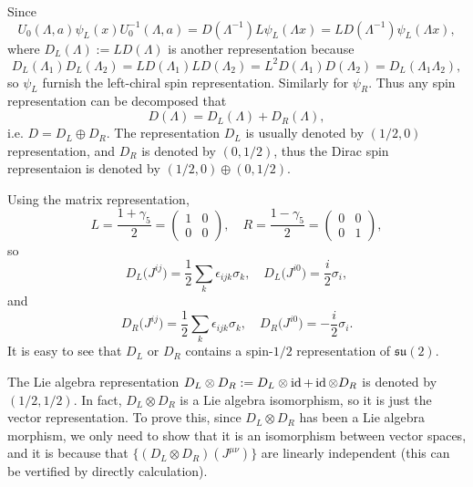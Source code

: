 \documentclass[9pt]{extbook}
\begin{document}
Since
\[
	U_0(\Lambda,a)\psi_L(x)U_0^{-1}(\Lambda,a)=D(\Lambda^{-1})L\psi_L(\Lambda x)=LD(\Lambda^{-1})\psi_L(\Lambda x),
\]
where $D_L(\Lambda):=LD(\Lambda)$ is another representation because
\[
	D_L(\Lambda_1)D_L(\Lambda_2)=LD(\Lambda_1)LD(\Lambda_2)=L^2D(\Lambda_1)D(\Lambda_2)=D_L(\Lambda_1\Lambda_2),
\]
so $\psi_L$ furnish the left-chiral spin representation. Similarly for $\psi_R$. Thus any spin representation can be decomposed that
\[
	D(\Lambda)=D_L(\Lambda)+D_R(\Lambda),
\]
i.e. $D=D_L\oplus D_R$. The representation $D_L$ is usually denoted by $(1/2,0)$ representation, and $D_R$ is denoted by $(0,1/2)$, thus the Dirac spin representaion is denoted by $(1/2,0)\oplus (0,1/2)$.

Using the matrix representation,
\[
	L=\frac{1+\gamma_5}{2}=\begin{pmatrix}
		1&0\\
		0&0
	\end{pmatrix},\quad R=\frac{1-\gamma_5}{2}=\begin{pmatrix}
		0&0\\
		0&1
	\end{pmatrix},
\]
so
\[
	D_L\bigl(J^{ij}\bigr)=\frac{1}{2}\sum_k\epsilon_{ijk}\sigma_k,\quad D_L\bigl(J^{i0}\bigr)=\frac{i}{2}\sigma_i,
\]
and
\[
	D_R\bigl(J^{ij}\bigr)=\frac{1}{2}\sum_k\epsilon_{ijk}\sigma_k,\quad D_R\bigl(J^{i0}\bigr)=-\frac{i}{2}\sigma_i.
\]
It is easy to see that $D_L$ or $D_R$ contains a spin-$1/2$ representation of $\mathfrak{su}(2)$.

The Lie algebra representation $D_L\otimes D_R:=D_L\otimes \operatorname{id}+\operatorname{id} \otimes D_R$ is denoted by $(1/2,1/2)$. In fact, $D_L\otimes D_R$ is a Lie algebra isomorphism, so it is just the vector representation. To prove this, since $D_L\otimes D_R$ has been a Lie algebra morphism, we only need to show that it is an isomorphism between vector spaces, and it is because that $\{(D_L\otimes D_R)(J^{\mu\nu})\}$ are linearly independent (this can be vertified by directly calculation). 
\end{document}
